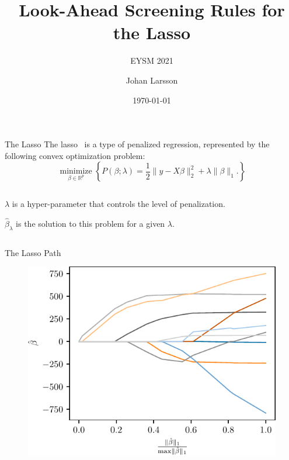 \documentclass[10pt,ignorenonframetext]{beamer}
\title{Look-Ahead Screening Rules for the Lasso}
\subtitle{EYSM 2021}
\author{Johan Larsson}
\date{\today}
\institute{Department of Statistics, Lund University}
\begin{document}
\frame[plain]{\titlepage}


\begin{frame}{The Lasso}
  The lasso~\parencite{tibshirani1996} is a type of penalized regression,
  represented by the following
  convex optimization problem:
  \[
    \operatorname*{minimize}_{\beta \in \mathbb{R}^p}
    \left\{
      P(\beta; \lambda) = \frac 1 2 \lVert y - X\beta \rVert_2^2
      + \lambda \lVert \beta \rVert_1.
    \right\}
  \]

  \begin{columns}[c]
    \begin{column}{0.45\linewidth}
      \(\lambda\) is a hyper-parameter that controls the level of
      \alert{penalization}.
      \medskip\medskip

      \(\hat\beta_\lambda\) is the solution to this problem for a given
      \(\lambda.\)

    \end{column}
    \begin{column}{0.45\linewidth}
      \begin{figure}
        \centering
        \pgfplotsset{width=6cm,height=6cm}
        
      \end{figure}
    \end{column}
  \end{columns}


\end{frame}

\begin{frame}{The Lasso Path}
  \begin{figure}
    \includegraphics{images/lasso-path}
  \end{figure}
\end{frame}
\end{document}
